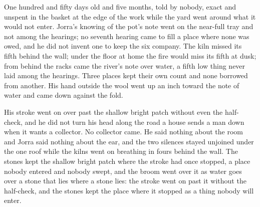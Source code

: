 One hundred and fifty days old and five months, told by nobody, exact and unspent in the basket at the edge of the work while the yard went around what it would not enter. Jorra's knowing of the pot's note went on the near-full tray and not among the hearings; no seventh hearing came to fill a place where none was owed, and he did not invent one to keep the six company. The kiln missed its fifth behind the wall; under the floor at home the fire would miss its fifth at dusk; from behind the racks came the river's note over water, a fifth low thing never laid among the hearings. Three places kept their own count and none borrowed from another. His hand outside the wool went up an inch toward the note of water and came down against the fold.

His stroke went on over  past the shallow bright patch without even the half-check, and he did not turn his head along the road a house sends a man down when it wants a collector. No collector came. He said nothing about the room and Jorra said nothing about the ear, and the two silences stayed unjoined under the one roof while the kilns went on breathing in fours behind the wall. The stones kept the shallow bright patch where the stroke had once stopped, a place nobody entered and nobody swept, and the broom went over it as water goes over a stone that lies where a stone lies: the stroke went on past it without the half-check, and the stones kept the place where it stopped as a thing nobody will enter.
